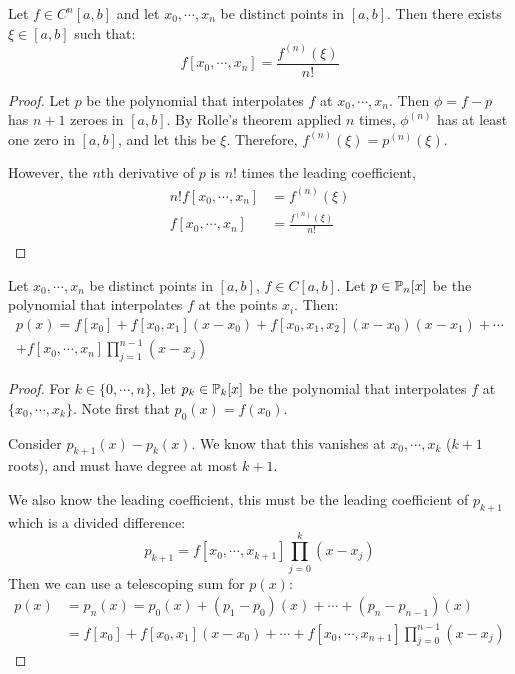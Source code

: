 \documentclass[../Main.tex]{subfiles}
\begin{document}
\begin{theorem}
    Let $f \in C^n[a, b]$ and let $x_0, \cdots, x_n$ be distinct points in $[a, b]$. Then there exists $\xi \in [a, b]$ such that:
    \begin{equation*}
        f[x_0, \cdots, x_n] = \frac{f^{(n)}(\xi)}{n!}
    \end{equation*}
    \label{thmDivDiffDerivs}
\end{theorem}
\begin{proof}
    Let $p$ be the polynomial that interpolates $f$ at $x_0, \cdots, x_n$. Then $\phi = f - p$ has $n+1$ zeroes in $[a, b]$. By Rolle's theorem applied $n$ times, $\phi^{(n)}$ has at least one zero in $[a, b]$, and let this be $\xi$. Therefore, $f^{(n)}(\xi) = p^{(n)}(\xi)$.

    However, the $n$th derivative of $p$ is $n!$ times the leading coefficient,
    \begin{align*}
        n! f[x_0, \cdots, x_n] &= f^{(n)}(\xi) \\
        f[x_0, \cdots, x_n] &= \frac{f^{(n)}(\xi)}{n!} \\
    \end{align*}
\end{proof}
\begin{theorem}
    Let $x_0, \cdots, x_n$ be distinct points in $[a, b]$, $f \in C[a, b]$. Let $p \in \P_n[x]$ be the polynomial that interpolates $f$ at the points $x_i$. Then:
    \begin{equation}
        \begin{split}
            p(x) = f[x_0] + f[x_0, x_1](x - x_0) + f[x_0, x_1, x_2] (x - x_0)(x - x_1) + \cdots \\
            +f[x_0, \cdots, x_n] \prod_{j=1}^{n-1} (x - x_j)
        \end{split}
        \label{eqnNewtonInterp}
    \end{equation}
    \label{thmNewtonInterp}
\end{theorem}
\begin{proof}
    For $k \in \{0, \cdots, n\}$, let $p_k \in \P_k[x]$ be the polynomial that interpolates $f$ at $\{x_0, \cdots, x_k\}$. Note first that $p_0(x) = f(x_0)$.
    
    Consider $p_{k+1}(x) - p_k(x)$. We know that this vanishes at $x_0, \cdots, x_k$ ($k + 1$ roots), and must have degree at most $k + 1$.

    We also know the leading coefficient, this must be the leading coefficient of $p_{k+1}$ which is a divided difference:
    \begin{equation*}
        p_{k+1} = f[x_0, \cdots, x_{k+1}] \prod_{j=0}^{k} (x - x_j)
    \end{equation*}
    Then we can use a telescoping sum for $p(x)$:
    \begin{align*}
        p(x) &= p_n(x) = p_0(x) + (p_1 - p_0)(x) + \cdots + (p_n - p_{n-1})(x) \\
        &= f[x_0] + f[x_0, x_1] (x - x_0) + \cdots + f[x_0, \cdots, x_{n+1}] \prod_{j=0}^{n-1} (x - x_j)
    \end{align*}
\end{proof}
\end{document}
